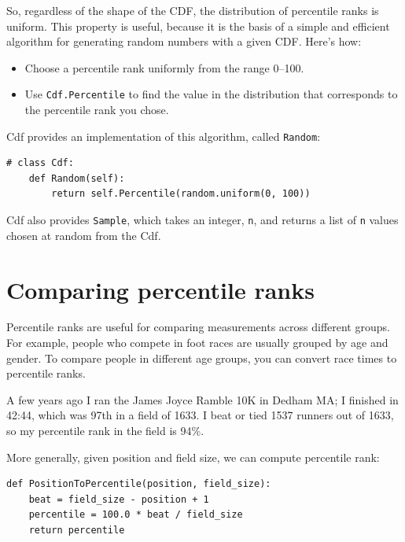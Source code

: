 \documentclass[12pt]{book}
\theoremstyle{exercise}
\begin{document}
So, regardless of the shape of the CDF, the distribution of
percentile ranks is uniform.  This property is useful, because it
is the basis of a simple and efficient algorithm for generating
random numbers with a given CDF.  Here's how:%
%

\begin{itemize}

\item Choose a percentile rank uniformly from the range 0--100.

\item Use {\tt Cdf.Percentile} to find the value in the distribution
that corresponds to the percentile rank you chose.%

\end{itemize}

Cdf provides an implementation of this algorithm, called
{\tt Random}:

\begin{verbatim}
# class Cdf:
    def Random(self):
        return self.Percentile(random.uniform(0, 100))
\end{verbatim}

Cdf also provides {\tt Sample}, which takes an integer,
{\tt n}, and returns a list of {\tt n} values chosen at random
from the Cdf.


\section{Comparing percentile ranks}

Percentile ranks are useful for comparing measurements across
different groups.  For example, people who compete in foot races are
usually grouped by age and gender.  To compare people in different
age groups, you can convert race times to percentile ranks.%

A few years ago I ran the James Joyce Ramble 10K in
Dedham MA; I finished in 42:44, which was 97th in a field of 1633.  I beat or
tied 1537 runners out of 1633, so my percentile rank in the field is
94\%.%
%

More generally, given position and field size, we can compute
percentile rank:%

\begin{verbatim}
def PositionToPercentile(position, field_size):
    beat = field_size - position + 1
    percentile = 100.0 * beat / field_size
    return percentile
\end{verbatim}
\end{document}
